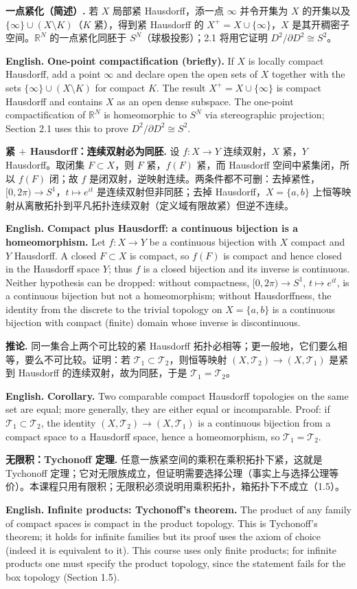 \documentclass[UTF8,11pt,a4paper]{ctexart}
\newcommand{\EN}[1]{\par\noindent\textbf{English.} #1\par}
\begin{document}
\noindent\textbf{一点紧化（简述）.} 若 $X$ 局部紧 Hausdorff，添一点 $\infty$ 并令开集为 $X$ 的开集以及 $\{\infty\}\cup(X\setminus K)$（$K$ 紧），得到紧 Hausdorff 的 $X^+=X\cup\{\infty\}$，$X$ 是其开稠密子空间。$\mathbb R^N$ 的一点紧化同胚于 $S^N$（球极投影）；2.1 将用它证明 $D^2/\partial D^2\cong S^2$。
\EN{\textbf{One-point compactification (briefly).} If $X$ is locally compact Hausdorff, add a point $\infty$ and declare open the open sets of $X$ together with the sets $\{\infty\}\cup(X\setminus K)$ for compact $K$. The result $X^+=X\cup\{\infty\}$ is compact Hausdorff and contains $X$ as an open dense subspace. The one-point compactification of $\mathbb R^N$ is homeomorphic to $S^N$ via stereographic projection; Section 2.1 uses this to prove $D^2/\partial D^2\cong S^2$.}

\noindent\textbf{紧 $+$ Hausdorff：连续双射必为同胚.} 设 $f:X\to Y$ 连续双射，$X$ 紧，$Y$ Hausdorff。取闭集 $F\subset X$，则 $F$ 紧，$f(F)$ 紧，而 Hausdorff 空间中紧集闭，所以 $f(F)$ 闭；故 $f$ 是闭双射，逆映射连续。两条件都不可删：去掉紧性，$[0,2\pi)\to S^1$，$t\mapsto e^{it}$ 是连续双射但非同胚；去掉 Hausdorff，$X=\{a,b\}$ 上恒等映射从离散拓扑到平凡拓扑连续双射（定义域有限故紧）但逆不连续。
\EN{\textbf{Compact plus Hausdorff: a continuous bijection is a homeomorphism.} Let $f:X\to Y$ be a continuous bijection with $X$ compact and $Y$ Hausdorff. A closed $F\subset X$ is compact, so $f(F)$ is compact and hence closed in the Hausdorff space $Y$; thus $f$ is a closed bijection and its inverse is continuous. Neither hypothesis can be dropped: without compactness, $[0,2\pi)\to S^1$, $t\mapsto e^{it}$, is a continuous bijection but not a homeomorphism; without Hausdorffness, the identity from the discrete to the trivial topology on $X=\{a,b\}$ is a continuous bijection with compact (finite) domain whose inverse is discontinuous.}

\noindent\textbf{推论.} 同一集合上两个可比较的紧 Hausdorff 拓扑必相等；更一般地，它们要么相等，要么不可比较。证明：若 $\mathcal T_1\subset\mathcal T_2$，则恒等映射 $(X,\mathcal T_2)\to(X,\mathcal T_1)$ 是紧到 Hausdorff 的连续双射，故为同胚，于是 $\mathcal T_1=\mathcal T_2$。
\EN{\textbf{Corollary.} Two comparable compact Hausdorff topologies on the same set are equal; more generally, they are either equal or incomparable. Proof: if $\mathcal T_1\subset\mathcal T_2$, the identity $(X,\mathcal T_2)\to(X,\mathcal T_1)$ is a continuous bijection from a compact space to a Hausdorff space, hence a homeomorphism, so $\mathcal T_1=\mathcal T_2$.}

\noindent\textbf{无限积：Tychonoff 定理.} 任意一族紧空间的乘积在乘积拓扑下紧，这就是 Tychonoff 定理；它对无限族成立，但证明需要选择公理（事实上与选择公理等价）。本课程只用有限积；无限积必须说明用乘积拓扑，箱拓扑下不成立（1.5）。
\EN{\textbf{Infinite products: Tychonoff's theorem.} The product of any family of compact spaces is compact in the product topology. This is Tychonoff's theorem; it holds for infinite families but its proof uses the axiom of choice (indeed it is equivalent to it). This course uses only finite products; for infinite products one must specify the product topology, since the statement fails for the box topology (Section 1.5).}
\end{document}

